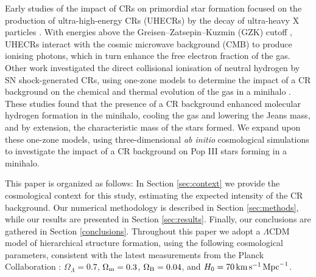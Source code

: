 \documentclass[usenatbib]{mn2e}
\newcommand{\kms}{\,\mathrm{km}\,\mathrm{s}^{-1}}
\newcommand{\Mpc}{\,{\rm Mpc}}
\begin{document}
Early studies of the impact of CRs on primordial star formation focused on the production of ultra-high-energy CRs (UHECRs) by the decay of ultra-heavy X particles \citep{ShchekinovVasiliev2004,VasilievShchekinov2006,RipamontiMapelliFerrara2007}.  
With energies above the Greisen--Zatsepin--Kuzmin (GZK) cutoff \citep{Greisen1966,ZatsepinKuzmin1966}, UHECRs interact with the cosmic microwave background (CMB) to produce ionising photons, which in turn enhance the free electron fraction of the gas.  
Other work investigated the direct collisional ionisation of neutral hydrogen by SN shock-generated CRs, using one-zone models to determine the impact of a CR background on the chemical and thermal evolution of the gas in a minihalo \citep{StacyBromm2007,JascheCiardiEnsslin2007}.  
These studies found that the presence of a CR background enhanced molecular hydrogen formation in the minihalo, cooling the gas and lowering the Jeans mass, and by extension, the characteristic mass of the stars formed. 
We expand upon these one-zone models, using three-dimensional \textit{ab initio} cosmological simulations to investigate the impact of a CR background on Pop III stars forming in a minihalo.

This paper is organized as follows: In Section \ref{sec:context} we provide the cosmological context for this study, estimating the expected intensity of the CR background. Our numerical methodology is described in Section \ref{sec:methods}, while our results are presented in Section \ref{sec:results}.  
Finally, our conclusions are gathered in Section \ref{conclusions}. Throughout this paper we adopt a $\Lambda$CDM model of hierarchical structure formation, using the following cosmological parameters, consistent with the latest measurements from the Planck Collaboration \citep{PlanckParams2015}: $\Omega_{\Lambda} = 0.7$, $\Omega_{\rm m} = 0.3$, $\Omega_{\rm B} = 0.04$, and $H_0 = 70 \kms \Mpc^{-1}$.
\end{document}

